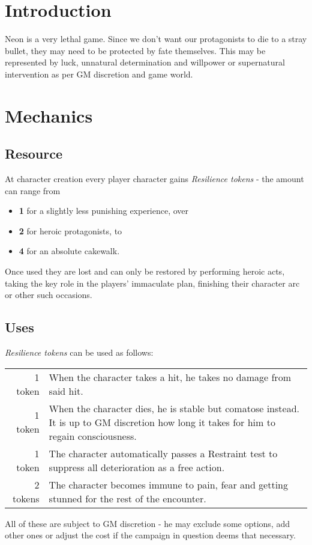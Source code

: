 \documentclass[12pt,a4paper,openany]{book}
\begin{document}
	

	\chapter{Introduction}
	Neon is a very lethal game. Since we don't want our protagonists to die to a stray bullet, they may need to be protected by fate themselves. 
	This may be represented by luck, unnatural determination and willpower or supernatural intervention as per GM discretion and game world.

	\chapter{Mechanics}
	\section{Resource}
	At character creation every player character gains \emph{Resilience tokens} - the amount can range from
	\begin{itemize}
		\item \textbf{1} for a slightly less punishing experience, over
		\item \textbf{2} for heroic protagonists, to
		\item \textbf{4} for an absolute cakewalk.
	\end{itemize}
	Once used they are lost and can only be restored by performing heroic acts, taking the key role in the players' immaculate plan, finishing their character arc or other such occasions.

	\pagebreak
	\section{Uses}
	\emph{Resilience tokens} can be used as follows:
	\par
	\begin{tabularx}{\columnwidth}{rX}
		1 token & When the character takes a hit, he takes no damage from said hit. \\
		1 token & When the character dies, he is stable but comatose instead. It is up to GM discretion how long it takes for him to regain consciousness. \\
		1 token & The character automatically passes a Restraint test to suppress all deterioration as a free action. \\
		2 tokens & The character becomes immune to pain, fear and getting stunned for the rest of the encounter.
	\end{tabularx}
	\par
	All of these are subject to GM discretion - he may exclude some options, add other ones or adjust the cost if the campaign in question deems that necessary.
\end{document}
